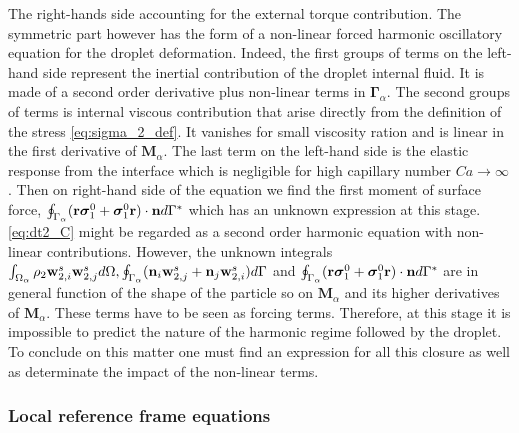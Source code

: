 The right-hands side accounting for the external torque contribution. 
The symmetric part however has the form of a non-linear forced harmonic oscillatory equation for the droplet deformation. 
Indeed, the first groups of terms on the left-hand side represent the inertial contribution of the droplet internal fluid. 
It is made of a second order derivative plus non-linear terms in $\bm\Gamma_\alpha$. 
The second groups of terms is internal viscous contribution that arise directly from the definition of the stress \ref{eq:sigma_2_def}. 
It vanishes for small viscosity ration and is linear in the first derivative of $\textbf{M}_\alpha$. 
The last term on the left-hand side is the elastic response from the interface which is negligible for high capillary number $Ca \to \infty$. 
Then on right-hand side of the equation we find the first moment of surface force, $\oint_{\Gamma_\alpha} (\textbf{r}\bm\sigma_1^0+ \bm\sigma_1^0\textbf{r})\cdot \textbf{n} d\Gamma^*$ which has an unknown expression at this stage. 
\ref{eq:dt2_C} might be regarded as a second order harmonic equation with non-linear contributions. 
However, the unknown integrals $\int_{\Omega_\alpha} \rho_2 \textbf{w}_{2,i}^s\textbf{w}_{2,j}^s d\Omega,
\oint_{\Gamma_\alpha} (\textbf{n}_i \textbf{w}_{2,j}^s + \textbf{n}_j \textbf{w}_{2,i}^s) d\Gamma$ and $\oint_{\Gamma_\alpha} (\textbf{r}\bm\sigma_1^0+ \bm\sigma_1^0\textbf{r})\cdot \textbf{n} d\Gamma^*$ are in general function of the shape of the particle so on $\textbf{M}_\alpha$ and its higher derivatives of $\textbf{M}_\alpha$.
These terms have to be seen as forcing terms. 
Therefore, at this stage it is impossible to predict the nature of the harmonic regime followed by the droplet. 
To conclude on this matter one must find an expression for all this closure as well as determinate the impact of the non-linear terms.

\subsubsection{Local reference frame equations}

